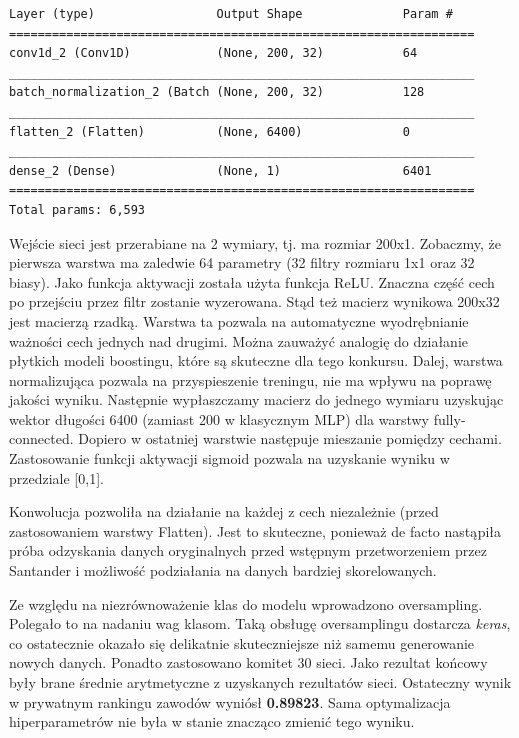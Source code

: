 \documentclass[12pt]{article}
\begin{document}
\begin{lstlisting}[caption={Model sieci CNN}, captionpos=b]
Layer (type)                 Output Shape              Param #   
=================================================================
conv1d_2 (Conv1D)            (None, 200, 32)           64        
_________________________________________________________________
batch_normalization_2 (Batch (None, 200, 32)           128       
_________________________________________________________________
flatten_2 (Flatten)          (None, 6400)              0         
_________________________________________________________________
dense_2 (Dense)              (None, 1)                 6401      
=================================================================
Total params: 6,593
\end{lstlisting} 

Wejście sieci jest przerabiane na 2 wymiary, tj. ma rozmiar 200x1. 
Zobaczmy, że pierwsza warstwa ma zaledwie 64 parametry (32 filtry rozmiaru 1x1 oraz 32 biasy). Jako funkcja aktywacji została użyta funkcja ReLU. Znaczna część cech po przejściu przez filtr zostanie wyzerowana. Stąd też macierz wynikowa 200x32 jest macierzą rzadką. Warstwa ta pozwala na automatyczne wyodrębnianie ważności cech jednych nad drugimi. Można zauważyć analogię do działanie płytkich modeli boostingu, które są skuteczne dla tego konkursu. Dalej, warstwa normalizująca pozwala na przyspieszenie treningu, nie ma wpływu na poprawę jakości wyniku. Następnie wypłaszczamy macierz do jednego wymiaru uzyskując wektor długości 6400 (zamiast 200 w klasycznym MLP) dla warstwy fully-connected. Dopiero w ostatniej warstwie następuje mieszanie pomiędzy cechami. Zastosowanie funkcji aktywacji sigmoid pozwala na uzyskanie wyniku w przedziale [0,1].

Konwolucja pozwoliła na działanie na każdej z cech niezależnie (przed zastosowaniem warstwy Flatten). Jest to skuteczne, ponieważ de facto nastąpiła próba odzyskania danych oryginalnych przed wstępnym przetworzeniem przez Santander i możliwość podziałania na danych bardziej skorelowanych. 

Ze względu na niezrównoważenie klas do modelu wprowadzono oversampling. Polegało to na nadaniu wag klasom. Taką obsługę oversamplingu dostarcza \textit{keras}, co ostatecznie okazało się delikatnie skuteczniejsze niż samemu generowanie nowych danych. Ponadto zastosowano komitet 30 sieci. Jako rezultat końcowy były brane średnie arytmetyczne z uzyskanych rezultatów sieci. Ostateczny wynik w prywatnym rankingu zawodów wyniósł \textbf{0.89823}. Sama optymalizacja hiperparametrów nie była w stanie znacząco zmienić tego wyniku.
\end{document}
